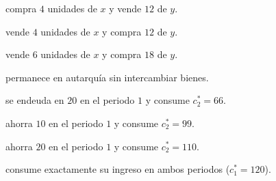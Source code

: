 \begin{opts}
    \item compra $4$ unidades de $x$ y vende $12$ de $y$.
    \item vende $4$ unidades de $x$ y compra $12$ de $y$.
    \item vende $6$ unidades de $x$ y compra $18$ de $y$.
    \item permanece en autarquía sin intercambiar bienes.
\end{opts}

\begin{opts}
    \item se endeuda en $20$ en el periodo $1$ y consume $c_2^* = 66$.
    \item ahorra $10$ en el periodo $1$ y consume $c_2^* = 99$.
    \item ahorra $20$ en el periodo $1$ y consume $c_2^* = 110$.
    \item consume exactamente su ingreso en ambos periodos ($c_1^* = 120$).
\end{opts}

